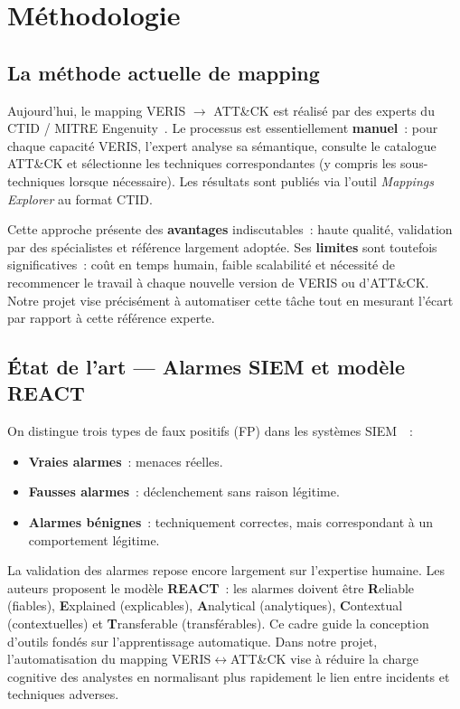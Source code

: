 \documentclass[a4paper,12pt]{article}
\begin{document}
\section{Méthodologie}


\subsection{La méthode actuelle de mapping}

Aujourd'hui, le mapping VERIS $\rightarrow$ ATT\&CK est réalisé par des experts du
CTID / MITRE Engenuity~\cite{ctid_mappings}. Le processus est essentiellement
\textbf{manuel}~: pour chaque capacité VERIS, l'expert analyse sa sémantique, consulte
le catalogue ATT\&CK et sélectionne les techniques correspondantes (y compris les
sous-techniques lorsque nécessaire). Les résultats sont publiés via l'outil
\emph{Mappings Explorer} au format CTID.

Cette approche présente des \textbf{avantages} indiscutables~: haute qualité,
validation par des spécialistes et référence largement adoptée. Ses
\textbf{limites} sont toutefois significatives~: coût en temps humain, faible
scalabilité et nécessité de recommencer le travail à chaque nouvelle version de VERIS
ou d'ATT\&CK. Notre projet vise précisément à automatiser cette tâche tout en
mesurant l'écart par rapport à cette référence experte.

\subsection{État de l'art --- Alarmes SIEM et modèle REACT}

On distingue trois types de faux positifs (FP) dans les systèmes SIEM~\cite{react_model}~:
\begin{itemize}
    \item \textbf{Vraies alarmes}~: menaces réelles.
    \item \textbf{Fausses alarmes}~: déclenchement sans raison légitime.
    \item \textbf{Alarmes bénignes}~: techniquement correctes, mais correspondant à un comportement légitime.
\end{itemize}

La validation des alarmes repose encore largement sur l'expertise humaine. Les auteurs
proposent le modèle \textbf{REACT}~: les alarmes doivent être \textbf{R}eliable
(fiables), \textbf{E}xplained (explicables), \textbf{A}nalytical (analytiques),
\textbf{C}ontextual (contextuelles) et \textbf{T}ransferable (transférables). Ce
cadre guide la conception d'outils fondés sur l'apprentissage automatique. Dans notre
projet, l'automatisation du mapping VERIS$\leftrightarrow$ATT\&CK vise à réduire la
charge cognitive des analystes en normalisant plus rapidement le lien entre incidents
et techniques adverses.
\end{document}
